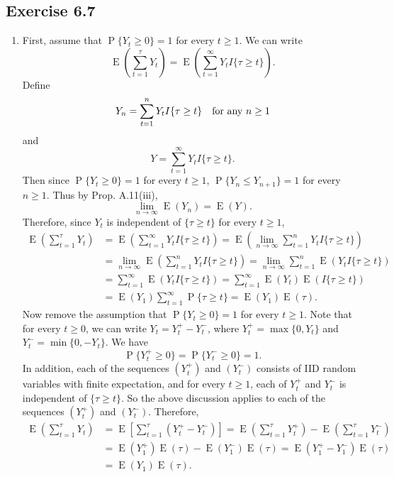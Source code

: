 \documentclass[12pt]{article}
\DeclareMathOperator{\E}{E}
\DeclareMathOperator{\Prob}{P}
\begin{document}
\subsection*{Exercise 6.7}

\begin{enumerate}[label=(\alph*)]
\item
First, assume that $\Prob\{Y_t \geq 0\} = 1$ for every $t \geq 1$. We can write
\begin{equation*}
\E\left(\sum_{t=1}^\tau Y_t\right) = \E\left(\sum_{t=1}^\infty Y_t I\{\tau \geq t\} \right).
\end{equation*}
Define
\begin{equation*}
Y_n = \sum_{t=1}^n Y_t I\{\tau \geq t\} \quad \text{for any $n \geq 1$} \\
\end{equation*}
and
\begin{equation*}
Y = \sum_{t=1}^\infty Y_t I\{\tau \geq t\}.
\end{equation*}
Then since $\Prob\{Y_t \geq 0\} = 1$ for every $t \geq 1$, $\Prob\{Y_n \leq Y_{n+1}\} = 1$ for every $n \geq 1$. Thus by Prop. A.11(iii),
\begin{equation*}
\lim_{n \to \infty} \E(Y_n) = \E(Y).
\end{equation*}
Therefore, since $Y_t$ is independent of $\{\tau \geq t\}$ for every $t \geq 1$,
\begin{align*}
\E\left(\sum_{t=1}^\tau Y_t\right) &= \E\left(\sum_{t=1}^\infty Y_t I\{\tau \geq t\} \right) = \E\left(\lim_{n \to \infty} \sum_{t=1}^n Y_t I\{\tau \geq t\} \right) \\
&= \lim_{n \to \infty} \E\left(\sum_{t=1}^n Y_t I\{\tau \geq t\} \right) = \lim_{n \to \infty} \sum_{t=1}^n \E(Y_t I\{\tau \geq t\}) \\
&= \sum_{t=1}^\infty \E(Y_t I\{\tau \geq t\}) = \sum_{t=1}^\infty \E(Y_t) \E(I\{\tau \geq t\}) \\
&= \E(Y_1) \sum_{t=1}^\infty \Prob\{\tau \geq t\} = \E(Y_1) \E(\tau).
\end{align*}
Now remove the assumption that $\Prob\{Y_t \geq 0\} = 1$ for every $t \geq 1$. Note that for every $t \geq 0$, we can write $Y_t = Y_t^+ - Y_t^-$, where $Y_t^+ = \max\{0, Y_t\}$ and $Y_t^- = \min\{0, -Y_t\}$. We have
\begin{equation*}
\Prob\{Y_t^+ \geq 0\} = \Prob\{Y_t^- \geq 0\} = 1.
\end{equation*}
In addition, each of the sequences $(Y_t^+)$ and $(Y_t^-)$ consists of IID random variables with finite expectation, and for every $t \geq 1$, each of $Y_t^+$ and $Y_t^-$ is independent of $\{\tau \geq t\}$. So the above discussion applies to each of the sequences $(Y_t^+)$ and $(Y_t^-)$. Therefore,
\begin{align*}
\E\left(\sum_{t=1}^\tau Y_t\right) &= \E\left[\sum_{t=1}^\tau (Y_t^+ - Y_t^-) \right] = \E\left(\sum_{t=1}^\tau Y_t^+\right) - \E\left(\sum_{t=1}^\tau Y_t^-\right) \\
&= \E(Y_1^+) \E(\tau) - \E(Y_1^-) \E(\tau) = \E(Y_1^+ - Y_1^-) \E(\tau) \\
&= \E(Y_1) \E(\tau).
\end{align*}


\end{enumerate}
\end{document}
